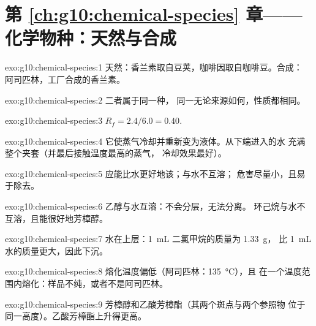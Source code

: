 \section*{第 \ref{ch:g10:chemical-species} 章——化学物种：天然与合成}

\begin{solution}{exo:g10:chemical-species:1}
天然：香兰素取自豆荚，咖啡因取自咖啡豆。合成：
阿司匹林，工厂合成的香兰素。
\end{solution}

\begin{solution}{exo:g10:chemical-species:2}
二者属于同一种，
同一无论来源如何，性质都相同。
\end{solution}

\begin{solution}{exo:g10:chemical-species:3}
$R_f = 2.4/6.0 = 0.40$.
\end{solution}

\begin{solution}{exo:g10:chemical-species:4}
它使蒸气冷却并重新变为液体。从下端进入的水
充满整个夹套（并最后接触温度最高的蒸气，
冷却效果最好）。
\end{solution}

\begin{solution}{exo:g10:chemical-species:5}
应能比水更好地该；与水不互溶；
危害尽量小，且易于除去。
\end{solution}

\begin{solution}{exo:g10:chemical-species:6}
乙醇与水互溶：不会分层，无法分离。
环己烷与水不互溶，且能很好地芳樟醇。
\end{solution}

\begin{solution}{exo:g10:chemical-species:7}
水在上层：\qty{1}{mL} 二氯甲烷的质量为 \qty{1.33}{g}，
比 \qty{1}{mL} 水的质量更大，因此下沉。
\end{solution}

\begin{solution}{exo:g10:chemical-species:8}
熔化温度偏低（阿司匹林：\qty{135}{\celsius}），且
在一个温度范围内熔化：样品不纯，或者不是阿司匹林。
\end{solution}

\begin{solution}{exo:g10:chemical-species:9}
芳樟醇和乙酸芳樟酯（其两个斑点与两个参照物
位于同一高度）。乙酸芳樟酯上升得更高。
\end{solution}

